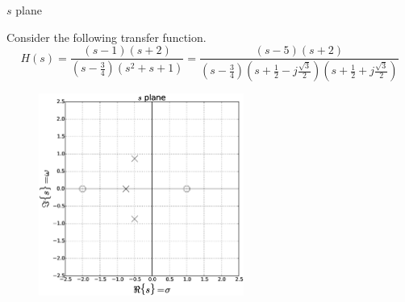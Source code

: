 \documentclass{beamer}
\begin{document}
\begin{frame}{$s$ plane}

Consider the following transfer function.
\[ H(s) = \frac{(s-1)(s+2)}{(s-\frac{3}{4})(s^2 + s + 1)} = \frac{(s-5)(s+2)}{(s-\frac{3}{4})(s +\frac{1}{2} - j\frac{\sqrt{3}}{2})(s +\frac{1}{2} + j\frac{\sqrt{3}}{2})}\]

\vspace{-5mm}
\begin{figure}
\includegraphics[width=0.6\textwidth]{img/splane.eps}
\end{figure}

\end{frame}
\end{document}
